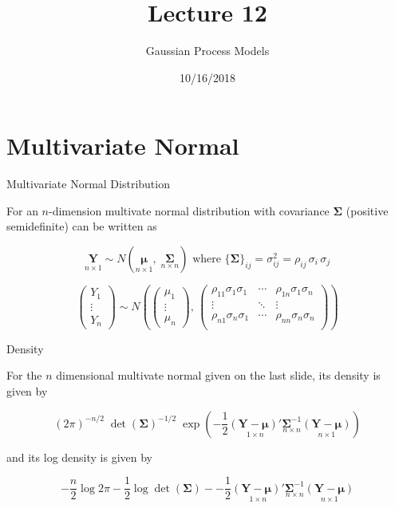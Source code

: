\documentclass[11pt,ignorenonframetext,]{beamer}
\title{Lecture 12}
\subtitle{Gaussian Process Models}
\date{10/16/2018}
\begin{document}
\frame{\titlepage}

\hypertarget{multivariate-normal}{%
\section{Multivariate Normal}\label{multivariate-normal}}

\begin{frame}[t]{Multivariate Normal Distribution}
\protect\hypertarget{multivariate-normal-distribution}{}

For an \(n\)-dimension multivate normal distribution with covariance
\(\symbf{\Sigma}\) (positive semidefinite) can be written as

\[
\underset{n \times 1}{\symbf{Y}} \sim N(\underset{n \times 1}{\symbf{\mu}}, \; \underset{n \times n}{\symbf{\Sigma}}) \text{   where   } \{\symbf{\Sigma}\}_{ij} = \sigma^2_{ij} = \rho_{ij} \, \sigma_{i} \, \sigma_{j}
\]

\vspace{2mm}

\[
\begin{pmatrix}
Y_1\\ \vdots\\ Y_n
\end{pmatrix}
\sim N\left(
\begin{pmatrix}
\mu_1\\ \vdots\\ \mu_n
\end{pmatrix}, \,
\begin{pmatrix}
\rho_{11}\sigma_1\sigma_1 & \cdots & \rho_{1n}\sigma_1\sigma_n \\
\vdots & \ddots & \vdots \\
\rho_{n1}\sigma_n\sigma_1 & \cdots & \rho_{nn}\sigma_n\sigma_n \\
\end{pmatrix}
\right)
\]

\end{frame}

\begin{frame}[t]{Density}
\protect\hypertarget{density}{}

For the \(n\) dimensional multivate normal given on the last slide, its
density is given by

\[
(2\pi)^{-n/2} \; \det(\symbf{\Sigma})^{-1/2} \; \exp{\left(-\frac{1}{2} \underset{1 \times n}{(\symbf{Y}-\symbf{\mu})'} \underset{n \times n}{\symbf{\Sigma}^{-1}} \underset{n \times 1}{(\symbf{Y}-\symbf{\mu})}\right)} 
\]

and its log density is given by

\[
-\frac{n}{2} \log 2\pi - \frac{1}{2} \log \det(\symbf{\Sigma}) - -\frac{1}{2} \underset{1 \times n}{(\symbf{Y}-\symbf{\mu})'} \underset{n \times n}{\symbf{\Sigma}^{-1}} \underset{n \times 1}{(\symbf{Y}-\symbf{\mu})}
\]

\end{frame}
\end{document}
